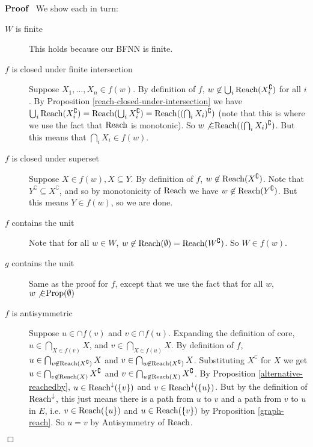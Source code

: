 \documentclass{article}
\newcommand{\nin}{\not\in}
\newcommand{\tmop}[1]{\ensuremath{\operatorname{#1}}}
\newenvironment{proof}{\noindent\textbf{Proof\ }}{\hspace*{\fill}$\Box$\medskip}
\newcommand{\Reach}{\textsf{\tmop{Reach}}}
\newcommand{\Reachedby}{\textsf{\tmop{Reach}}^{\downarrow}}
\newcommand{\Prop}{\textsf{\tmop{Prop}}}
\begin{document}
\begin{proof}
  We show each in turn:
  \begin{description}
    \item[$W$ is finite] This holds because our BFNN is finite.
    
    \item[$f$ is closed under finite intersection] Suppose $X_1, \ldots, X_n
    \in f (w)$. By definition of $f$, $w \nin \bigcup_i \Reach
    (X_i^{\complement})$ for all $i$. By Proposition
    \ref{reach-closed-under-intersection} we have $\bigcup_i \Reach
    (X_i^{\complement}) = \Reach (\bigcup_i X_i^{\complement}) = \Reach
    ((\bigcap_i X_i)^{\complement})$ (note that this is where we use the fact
    that $\Reach$ is monotonic). So $w \not{\in} \Reach ((\bigcap_i
    X_i)^{\complement})$. But this means that $\bigcap_i X_i \in f (w)$.
    
    \item[$f$ is closed under superset] Suppose $X \in f (w), X \subseteq Y$.
    By definition of $f$, $w \nin \Reach (X^{\complement})$. Note that
    $Y^{\complement} \subseteq X^{\complement}$, and so by monotonicity of
    $\Reach$ we have $w \nin \Reach (Y^{\complement})$. But this means $Y \in
    f (w)$, so we are done.
    
    \item[$f$ contains the unit] Note that for all $w \in W$, $w \nin \Reach
    (\emptyset) = \Reach (W^{\complement})$. So $W \in f (w)$.
    
    \item[$g$ contains the unit] Same as the proof for $f$, except that we use
    the fact that for all $w$, $w \not{\in} \Prop (\emptyset)$
    
    \item[$f$ is antisymmetric] Suppose $u \in \cap f (v)$ and $v \in \cap f
    (u)$. Expanding the definition of core, $u \in \bigcap_{X \in f (v)} X$,
    and $v \in \bigcap_{X \in f (u)} X$. By definition of $f$, $u \in
    \bigcap_{v \not{\in} \Reach (X^{\complement})} X$ and $v \in \bigcap_{u
    \not{\in} \Reach (X^{\complement})} X$. Substituting $X^{\complement}$ for
    $X$ we get $u \in \bigcap_{v \not{\in} \Reach (X)} X^{\complement}$ and $v
    \in \bigcap_{u \not{\in} \Reach (X)} X^{\complement}$. By Proposition
    \ref{alternative-reachedby}, $u \in \Reachedby (\{ v \})$ and $v \in
    \Reachedby (\{ u \})$. But by the definition of $\Reachedby$, this just
    means there is a path from $u$ to $v$ and a path from $v$ to $u$ in $E$,
    i.e. $v \in \Reach (\{ u \})$ and $u \in \Reach (\{ v \})$ by Proposition
    \ref{graph-reach}. So $u = v$ by Antisymmetry of $\Reach$.
    

\end{description}
\end{proof}
\end{document}
